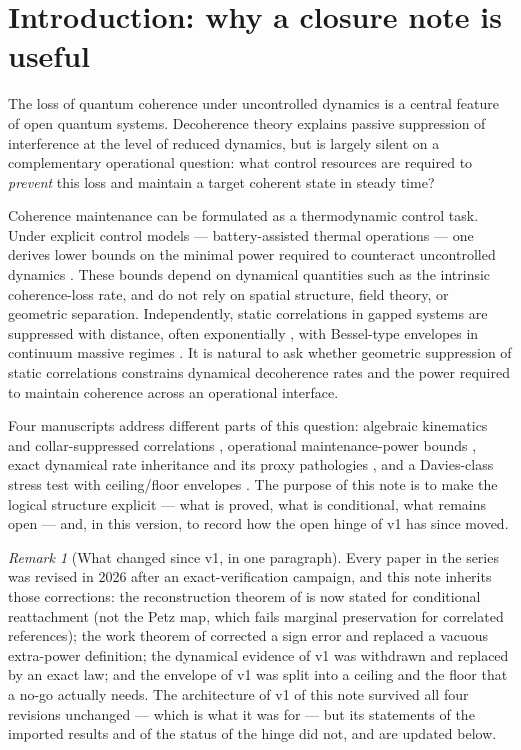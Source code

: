 \documentclass[11pt,a4paper]{article}
\theoremstyle{plain}
\theoremstyle{definition}
\theoremstyle{remark}
\newtheorem{remark}[theorem]{Remark}
\begin{document}
\section{Introduction: why a closure note is useful}

The loss of quantum coherence under uncontrolled dynamics is a central feature
of open quantum systems. Decoherence theory explains passive suppression of
interference at the level of reduced dynamics, but is largely silent on a
complementary operational question: what control resources are required to
\emph{prevent} this loss and maintain a target coherent state in steady time?

Coherence maintenance can be formulated as a thermodynamic control task. Under
explicit control models --- battery-assisted thermal operations --- one derives
lower bounds on the minimal power required to counteract uncontrolled dynamics
\cite{MaintWork}. These bounds depend on dynamical quantities such as the
intrinsic coherence-loss rate, and do not rely on spatial structure, field
theory, or geometric separation. Independently, static correlations in gapped
systems are suppressed with distance, often exponentially
\cite{HastingsKoma}, with Bessel-type envelopes in continuum massive regimes
\cite{Clustering}. It is natural to ask whether geometric suppression of
static correlations constrains dynamical decoherence rates and the power
required to maintain coherence across an operational interface.

Four manuscripts address different parts of this question: algebraic
kinematics and collar-suppressed correlations \cite{Clustering}, operational
maintenance-power bounds \cite{MaintWork}, exact dynamical rate inheritance
and its proxy pathologies \cite{HCut}, and a Davies-class stress test with
ceiling/floor envelopes \cite{Stress}. The purpose of this note is to make the
logical structure explicit --- what is proved, what is conditional, what
remains open --- and, in this version, to record how the open hinge of v1 has
since moved.

\begin{remark}[What changed since v1, in one paragraph]\label{rem:whatmoved}
Every paper in the series was revised in 2026 after an exact-verification
campaign, and this note inherits those corrections: the reconstruction theorem
of \cite{Clustering} is now stated for conditional reattachment (not the Petz
map, which fails marginal preservation for correlated references); the work
theorem of \cite{MaintWork} corrected a sign error and replaced a vacuous
extra-power definition; the dynamical evidence of \cite{HCut} v1 was withdrawn
and replaced by an exact law; and the envelope of \cite{Stress} v1 was split
into a ceiling and the floor that a no-go actually needs. The architecture of
v1 of this note survived all four revisions unchanged --- which is what it was
for --- but its statements of the imported results and of the status of the
hinge did not, and are updated below.
\end{remark}
\end{document}
